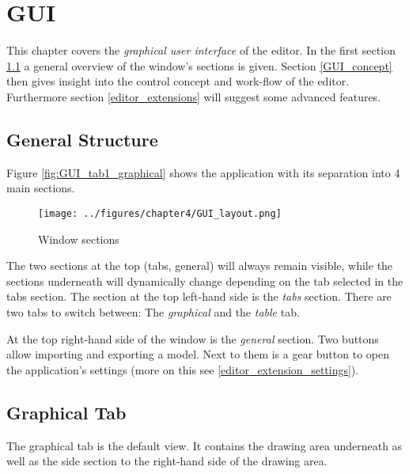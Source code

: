 \documentclass[twoside, openright, 12pt]{book}
\begin{document}
\section{GUI}
\label{editor_gui}
This chapter covers the \textit{graphical user interface} of the editor.
In the first section \ref{editor_structure} a general overview of the window's sections is given.
Section \ref{GUI_concept} then gives insight into the control concept and work-flow of the editor.
Furthermore section \ref{editor_extensions} will suggest some advanced features.



\subsection{General Structure}
\label{editor_structure}
Figure \ref{fig:GUI_tab1_graphical} shows the application with its separation into 4 main sections.

\begin{figure}[htb]
	\centering
	\texttt{[image: ../figures/chapter4/GUI\_layout.png]}
	\caption{Window sections}
	\label{fig:GUI_layout}
\end{figure}

\noindent
The two sections at the top (tabs, general) will always remain visible, while the sections underneath will dynamically change depending on the tab selected in the tabs section.
The section at the top left-hand side is the \textit{tabs} section.
There are two tabs to switch between: The \textit{graphical} and the \textit{table} tab.

At the top right-hand side of the window is the \textit{general} section.
Two buttons allow importing and exporting a model.
Next to them is a gear button to open the application's settings (more on this see \ref{editor_extension_settings}).



\subsection{Graphical Tab}
\label{editor_graphical}
The graphical tab is the default view.
It contains the drawing area underneath as well as the side section to the right-hand side of the drawing area.
\end{document}
